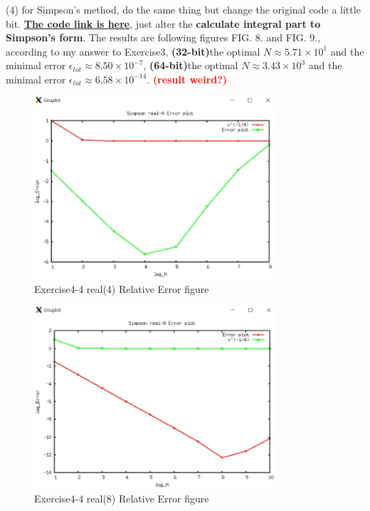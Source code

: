 \documentclass[aps,12pt,prd,nofootinbib,bibnotes, amsmath,amssymb,showpacs,superscriptaddress,floatfix]{revtex4-2}
\begin{document}
(4)
for Simpson's method, do the same thing but change the original code a little bit. \href{https://github.com/kuo1235/Computational-Astrophysics-2022/blob/main/astr660/Homework/HW2/simpson.f90}{\bf{The code link is here}}, just alter the {\bf{calculate integral part to Simpson's form}}. The results are following figures FIG. 8. and FIG. 9., according to my answer to Exercise3, {\bf{(32-bit)}}the optimal $N \approx 5.71 \times 10^1$ and the minimal error $\epsilon_{tot} \approx 8.50 \times 10^{-7}$, {\bf{(64-bit)}}the optimal $N \approx 3.43 \times 10^3$ and the minimal error $\epsilon_{tot} \approx 6.58 \times 10^{-14}$. \textcolor{red}{\bf{(result weird?)}}
\begin{figure}
	\centering
	\includegraphics[width=0.8\textwidth]{Exercise4-4_real4}
	\caption{Exercise4-4 real(4) Relative Error figure}
\end{figure}
\begin{figure}
	\centering
	\includegraphics[width=0.8\textwidth]{Exercise4-4_real8}
	\caption{Exercise4-4 real(8) Relative Error figure}
\end{figure}
\end{document}
